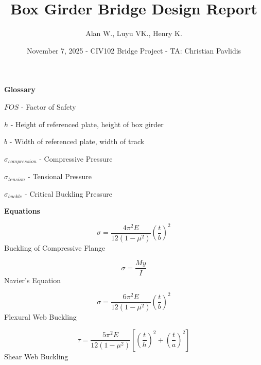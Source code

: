 \documentclass[prl,twocolumn,secnumarabic, amsmath,amssymb,superscriptaddress]{revtex4-2}
\begin{document}
\vspace*{1cm}
\title{\Large{Box Girder Bridge Design Report} }
\author{Alan W., Luyu VK., Henry K.}

\date{November 7, 2025 - CIV102 Bridge Project - TA: Christian Pavlidis}

\maketitle

\onecolumngrid
\tableofcontents

\vspace{20pt}
\textbf{\large{Glossary}} \vspace{10pt}

$FOS$ - Factor of Safety

$h$ - Height of referenced plate, height of box girder

$b$ - Width of referenced plate, width of track

$\sigma_{compression}$ - Compressive Pressure

$\sigma_{tension}$ - Tensional Pressure

$\sigma_{buckle}$ - Critical Buckling Pressure

\vspace{10pt}
\textbf{Equations}

\hspace{-20pt}
\vspace{-5pt}
\begin{minipage}{0.48\textwidth}
    \begin{equation}
        \sigma = \frac{4\pi^2E}{12(1-\mu^2)}\left(\frac{t}{b}\right)^2
        \label{Buckling of Compressive Flange}
    \end{equation}
    \centering Buckling of Compressive Flange
\end{minipage}
\hfill
\begin{minipage}{0.48\textwidth}
    \begin{equation}
        \sigma = \frac{My}{I}
        \label{Navier's Equation}
    \end{equation}
    \centering Navier's Equation
\end{minipage}

\hspace{-20pt}
\begin{minipage}{0.48\textwidth}
    \begin{equation}
        \sigma = \frac{6\pi^2E}{12(1-\mu^2)}\left(\frac{t}{b}\right)^2
        \label{Flexural Web Buckling}
    \end{equation}
    \centering Flexural Web Buckling
\end{minipage}
\hfill
\begin{minipage}{0.48\textwidth}
\begin{equation}
    \tau = \frac{5\pi^2E}{12(1-\mu^2)}\left[ \left(\frac{t}{h}\right)^2+ \left(\frac{t}{a}\right)^2 \right]
    \label{Shear Web Buckling}
\end{equation}
\centering Shear Web Buckling
\end{minipage}
\end{document}
